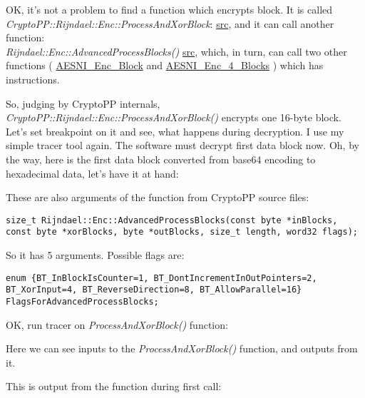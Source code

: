 OK, it's not a problem to find a function which encrypts block.
It is called \\
\emph{CryptoPP::Rijndael::Enc::ProcessAndXorBlock}:
\href{https://github.com/mmoss/cryptopp/blob/2772f7b57182b31a41659b48d5f35a7b6cedd34d/src/rijndael.cpp#L349}{src},
and it can call another function: \\
\emph{Rijndael::Enc::AdvancedProcessBlocks()}
\href{https://github.com/mmoss/cryptopp/blob/2772f7b57182b31a41659b48d5f35a7b6cedd34d/src/rijndael.cpp#L1179}{src},
which, in turn, can call two other functions (
\href{https://github.com/mmoss/cryptopp/blob/2772f7b57182b31a41659b48d5f35a7b6cedd34d/src/rijndael.cpp#L1000}{AESNI\_Enc\_Block}
and
\href{https://github.com/mmoss/cryptopp/blob/2772f7b57182b31a41659b48d5f35a7b6cedd34d/src/rijndael.cpp#L1012}{AESNI\_Enc\_4\_Blocks}
)
which has  instructions.

So, judging by CryptoPP internals, \\
\emph{CryptoPP::Rijndael::Enc::ProcessAndXorBlock()} encrypts one 16-byte block.
Let's set breakpoint on it and see, what happens during decryption.
I use my simple tracer tool again.
The software must decrypt first data block now.
Oh, by the way, here is the first data block converted from base64 encoding to hexadecimal data,
let's have it at hand:



These are also arguments of the function from CryptoPP source files:

\begin{lstlisting}
size_t Rijndael::Enc::AdvancedProcessBlocks(const byte *inBlocks, const byte *xorBlocks, byte *outBlocks, size_t length, word32 flags);
\end{lstlisting}

So it has 5 arguments. Possible flags are:

\begin{lstlisting}
enum {BT_InBlockIsCounter=1, BT_DontIncrementInOutPointers=2, BT_XorInput=4, BT_ReverseDirection=8, BT_AllowParallel=16} FlagsForAdvancedProcessBlocks;
\end{lstlisting}

OK, run tracer on \emph{ProcessAndXorBlock()} function:



Here we can see inputs to the \emph{ProcessAndXorBlock()} function, and outputs from it.

This is output from the function during first call:


